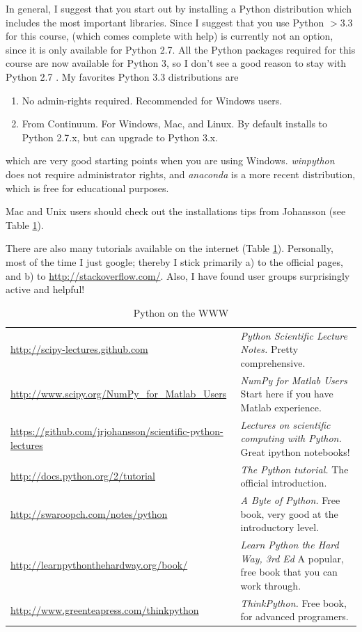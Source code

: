 In general, I suggest that you start out by installing a Python distribution which includes the most important libraries. Since I suggest that you use Python $>3.3$ for this course, \cite{pythonxy} (which comes complete with help) is currently not an option, since it is only available for Python 2.7. All the Python packages required for this course are now available for Python 3, so I don't see a good reason to stay with Python 2.7 . My favorites Python 3.3 distributions  are

\begin{enumerate}
    \item \cite{winpython} No admin-rights required. Recommended for Windows users.
    \item \cite{anaconda} From Continuum. For Windows, Mac, and Linux. By default installs to Python 2.7.x, but can upgrade to Python 3.x.
\end{enumerate}

which are very good starting points when you are using Windows. \emph{winpython} does not require administrator rights, and \emph{anaconda} is a more recent distribution, which is free for educational purposes.

Mac and Unix users should check out the installations tips from Johansson (see Table \ref{table:python}).

There are also many tutorials available on the internet (Table \ref{table:python}). Personally, most of the time I just google; thereby I stick primarily a) to the official pages, and b) to \url{http://stackoverflow.com/}. Also, I have found user groups surprisingly active and helpful!

\begin{table}

  \footnotesize{
  \centering
   \begin{tabular}{|p{8 cm}|p{8 cm}|}
     \hline
     \url{http://scipy-lectures.github.com} & \emph{Python Scientific Lecture Notes.} Pretty comprehensive. \\     \url{http://www.scipy.org/NumPy\_for\_Matlab\_Users} & \emph{NumPy for Matlab Users} Start here if you have Matlab experience. \\
     \url {https://github.com/jrjohansson/scientific-python-lectures} & \emph{Lectures on scientific computing with Python.} Great ipython notebooks! \\     \url{http://docs.python.org/2/tutorial} & \emph{The Python tutorial.} The official introduction. \\
     \url{http://swaroopch.com/notes/python} & \emph{A Byte of Python.} Free book, very good at the introductory level. \\
     \url{http://learnpythonthehardway.org/book/} & \emph{Learn Python the Hard Way, 3rd Ed} A popular, free book that you can work through. \\
     \url{http://www.greenteapress.com/thinkpython} & \emph{ThinkPython.} Free book, for advanced programers. \\

     \hline
   \end{tabular}
   }
  \caption{Python on the WWW}\label{table:python}
\end{table}

